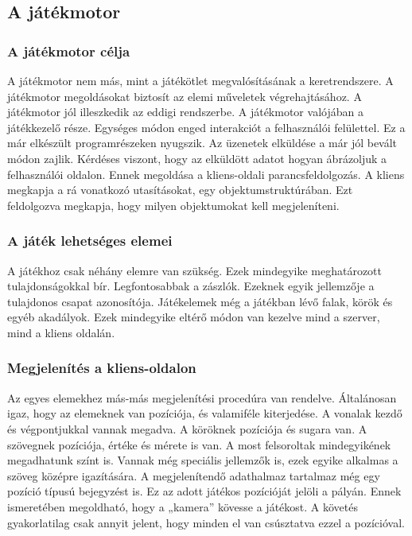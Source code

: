 \documentclass[]{article}
\begin{document}
\subsection{A játékmotor}


\subsubsection{A játékmotor célja}

A játékmotor nem más, mint a játékötlet megvalósításának a
keretrendszere. A játékmotor megoldásokat biztosít az elemi műveletek
végrehajtásához. A játékmotor jól illeszkedik az eddigi rendszerbe. A
játékmotor valójában a játékkezelő része. Egységes módon enged
interakciót a felhasználói felülettel. Ez a már elkészült
programrészeken nyugszik. Az üzenetek elküldése a már jól bevált módon
zajlik. Kérdéses viszont, hogy az elküldött adatot hogyan ábrázoljuk a
felhasználói oldalon. Ennek megoldása a kliens-oldali
parancsfeldolgozás. A kliens megkapja a rá vonatkozó utasításokat, egy
objektumstruktúrában. Ezt feldolgozva megkapja, hogy milyen objektumokat
kell megjeleníteni.


\subsubsection{A játék lehetséges
elemei}

A játékhoz csak néhány elemre van szükség. Ezek mindegyike meghatározott
tulajdonságokkal bír. Legfontosabbak a zászlók. Ezeknek egyik jellemzője
a tulajdonos csapat azonosítója. Játékelemek még a játékban lévő falak,
körök és egyéb akadályok. Ezek mindegyike eltérő módon van kezelve mind
a szerver, mind a kliens oldalán.


\subsubsection{Megjelenítés a
kliens-oldalon}

Az egyes elemekhez más-más megjelenítési procedúra van rendelve.
Általánosan igaz, hogy az elemeknek van pozíciója, és valamiféle
kiterjedése. A vonalak kezdő és végpontjukkal vannak megadva. A köröknek
pozíciója és sugara van. A szövegnek pozíciója, értéke és mérete is van.
A most felsoroltak mindegyikének megadhatunk színt is. Vannak még
speciális jellemzők is, ezek egyike alkalmas a szöveg középre
igazítására. A megjelenítendő adathalmaz tartalmaz még egy pozíció
típusú bejegyzést is. Ez az adott játékos pozícióját jelöli a pályán.
Ennek ismeretében megoldható, hogy a „kamera'' kövesse a játékost. A
követés gyakorlatilag csak annyit jelent, hogy minden el van csúsztatva
ezzel a pozícióval.
\end{document}

